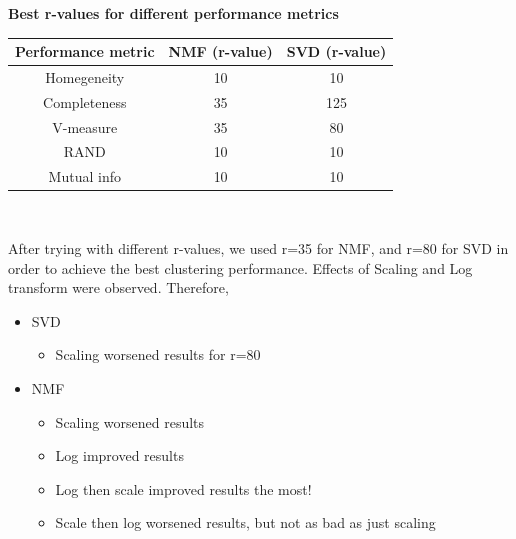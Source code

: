 \documentclass{report}
\begin{document}
\begin{center}
	\textbf{Best r-values for different performance metrics} \\ \vspace{10pt}
	\begin{tabular}{*{3}{c}}
		\toprule
		\textbf{Performance metric} & \textbf{NMF (r-value)} & \textbf{SVD (r-value)} \\
		\midrule
		Homegeneity & 10 & 10 \\
		\midrule		
		Completeness & 35 & 125 \\
		\midrule		
		V-measure & 35 & 80 \\
		\midrule		
		RAND & 10 & 10   \\
		\midrule
		Mutual info & 10 & 10  \\
		\bottomrule
	\end{tabular}
\end{center}
\\ \vspace{20pt}

After trying with different r-values, we used r=35 for NMF, and r=80 for SVD in order to achieve the best clustering performance. Effects of Scaling and Log transform were observed. Therefore,

\begin{itemize}
	\item SVD
	\begin{itemize}
		\item Scaling worsened results for r=80
	\end{itemize}
    \item NMF
	\begin{itemize}	    
    	\item Scaling worsened results 
		\item Log improved results 
		\item Log then scale improved results the most!
		\item Scale then log worsened results, but not as bad as just scaling	
 	\end{itemize}   
\end{itemize}
\end{document}
